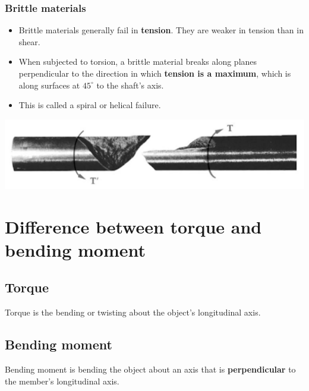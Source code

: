 \documentclass[11pt]{article}
\begin{document}
\subsubsection{Brittle materials}
\label{sec:orge73bd59}
\begin{itemize}
\item Brittle materials generally fail in \textbf{tension}. They are weaker in tension than in shear.
\item When subjected to torsion, a brittle material breaks along planes perpendicular to the direction in which \textbf{tension is a maximum}, which is along surfaces at \(45^{\circ}\) to the shaft's axis.
\item This is called a spiral or helical failure.
\end{itemize}

\begin{center}
\includegraphics[width=.9\linewidth]{./images/brittle-material-torsional-failure.png}
\end{center}

\newpage
\section{Difference between torque and bending moment}
\label{sec:org6d6f528}

\subsection{Torque}
\label{sec:org1b5d225}
Torque is the bending or twisting about the object's longitudinal axis.
\subsection{Bending moment}
\label{sec:org7a59abe}
Bending moment is bending the object about an axis that is \textbf{perpendicular} to the member's longitudinal axis.
\end{document}
